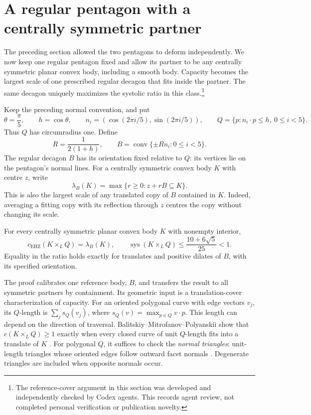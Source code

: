 \section{A regular pentagon with a centrally symmetric partner}
\label{sec:pentagon-symmetric-partner}

The preceding section allowed the two pentagons to deform independently.
We now keep one regular pentagon fixed and allow its partner to be any
centrally symmetric planar convex body, including a smooth body.
Capacity becomes the largest scale of one prescribed regular decagon that
fits inside the partner. The same decagon uniquely maximizes the systolic
ratio in this class.\footnote{The reference-cover argument in this section
was developed and independently checked by Codex agents. This records agent
review, not completed personal verification or publication novelty.}

Keep the preceding normal convention, and put
\[
 \theta=\frac\pi5,\qquad h=\cos\theta,\qquad
 n_i=(\cos(2\pi i/5),\sin(2\pi i/5)),\qquad
 Q=\{p:n_i\cdot p\le h,\ 0\le i<5\}.
\]
Thus $Q$ has circumradius one. Define
\[
 R=\frac1{2(1+h)},\qquad
 B=\operatorname{conv}\{\pm Rn_i:0\le i<5\}.
\]
The regular decagon $B$ has its orientation fixed relative to $Q$:
its vertices lie on the pentagon's normal lines.
For a centrally symmetric convex body $K$ with centre $z$, write
\[
 \lambda_B(K)=\max\{r\ge0:z+rB\subseteq K\}.
\]
This is also the largest scale of any translated copy of $B$ contained in
$K$. Indeed, averaging a fitting copy with its reflection through $z$
centres the copy without changing its scale.

\begin{theorem}\label{thm:pentagon-symmetric-partner}
For every centrally symmetric planar convex body $K$ with nonempty interior,
\[
 c_{\mathrm{EHZ}}(K\times_L Q)=\lambda_B(K),\qquad
 \operatorname{sys}(K\times_L Q)
 \le\frac{10+6\sqrt5}{25}<1.
\]
Equality in the ratio holds exactly for translates and positive dilates of
$B$, with its specified orientation.
\end{theorem}

The proof calibrates one reference body, $B$, and transfers the result to
all symmetric partners by containment. Its geometric input is a
translation-cover characterization of capacity.
For an oriented polygonal curve with edge vectors $v_j$, its $Q$-length is
$\sum_j s_Q(v_j)$, where $s_Q(v)=\max_{p\in Q}v\cdot p$.
This length can depend on the direction of traversal.
Balitskiy--Mitrofanov--Polyanskii show that $c(K\times_L Q)\ge1$ exactly
when every closed curve of unit $Q$-length fits into a translate of $K$
\cite[Theorem~2.5]{dsBMP2026}.
For polygonal $Q$, it suffices to check the \emph{normal triangles}:
unit-length triangles whose oriented edges follow outward facet normals
\cite[Definition~3.2 and Theorem~3.3]{dsBMP2026}.
Degenerate triangles are included when opposite normals occur.

